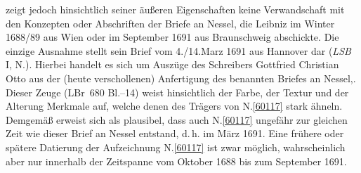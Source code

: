 zeigt jedoch hinsichtlich seiner äußeren Eigenschaften keine Verwandschaft mit den Konzepten oder Abschriften der Briefe an Nessel, die Leibniz im Winter 1688/89 aus Wien oder im September 1691 aus Braunschweig abschickte.
Die einzige Ausnahme stellt sein Brief vom 4./14.\;Marz 1691 aus Hannover dar (\textit{LSB} I, N.).\cite{01484}
Hierbei handelt es sich um Auszüge des Schreibers Gottfried Christian Otto aus der (heute verschollenen) Anfertigung des benannten Briefes an Nessel,.
Dieser Zeuge (LBr~680 Bl.--14) weist hinsichtlich der Farbe, der Textur und der Alterung Merkmale auf, welche denen des Trägers von N.\;\ref{60117} stark ähneln.
Demgemäß erweist sich als plausibel, dass auch N.\;\ref{60117} ungefähr zur gleichen Zeit wie dieser Brief an Nessel entstand, d.\,h. im März 1691.
Eine frühere oder spätere Datierung der Aufzeichnung N.\;\ref{60117} ist zwar möglich, wahrscheinlich aber nur innerhalb der Zeitspanne vom Oktober 1688 bis zum September 1691.
\pend%
%
\frenchspacing%
\normalsize%
\newpage%

